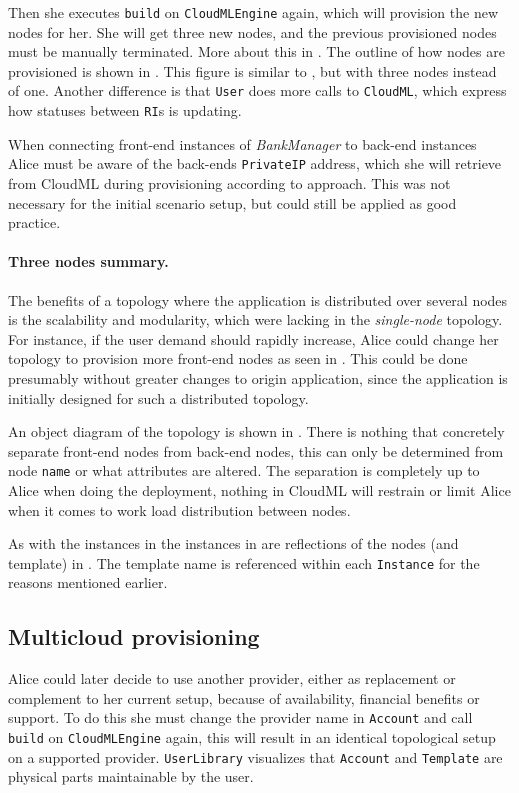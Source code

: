 Then she executes \texttt{build} on \texttt{CloudMLEngine} again,
which will provision the new nodes for her.
She will get three new nodes, and the previous provisioned nodes must be manually terminated.
More about this in .
The outline of how nodes are provisioned is shown in .
This figure is similar to , but with three nodes instead of one.
Another difference is that \texttt{User} does more calls to \texttt{CloudML},
which express how statuses between \texttt{RI}s is updating.

When connecting front-end instances of \emph{BankManager} to back-end instances Alice must 
be aware of the back-ends \texttt{PrivateIP} address, which she will retrieve from CloudML
during provisioning according to  approach.
This was not necessary for the initial scenario setup, but could still be applied
as good practice.

\paragraph{Three nodes summary.}


The benefits of a topology where the application is distributed over several nodes 
is the scalability and modularity, which were lacking in the \emph{single-node} topology.
For instance, if the user demand should rapidly increase, Alice could change her topology to
provision more front-end nodes as seen in .
This could be done presumably without greater changes to origin application,
since the application is initially designed for such a distributed topology.

An object diagram of the topology is shown in .
There is nothing that concretely separate front-end nodes from back-end nodes,
this can only be determined from node \texttt{name} or what attributes are altered.
The separation is completely up to Alice when doing the deployment,
\ie nothing in CloudML will restrain or limit Alice 
when it comes to work load distribution between nodes.

As with the instances in  the instances in 
are reflections of the nodes (and template) in .
The template name is referenced within each \texttt{Instance} 
for the reasons mentioned earlier.

\subsection{Multicloud provisioning}
Alice could later decide to use another provider, either as replacement or complement to her current setup,
because of availability, financial benefits or support.
To do this she must change the provider name in \texttt{Account} and call \texttt{build} on \texttt{CloudMLEngine} again,
this will result in an identical topological setup on a supported provider.
\texttt{UserLibrary} visualizes that \texttt{Account} and \texttt{Template} are 
physical parts maintainable by the user.

